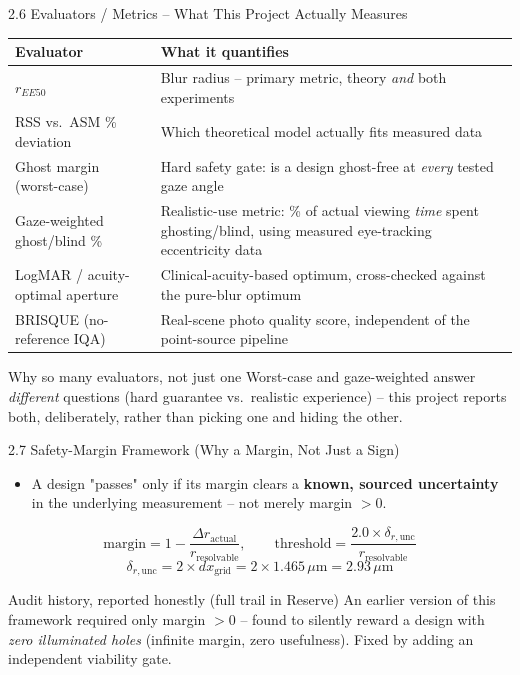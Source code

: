 \documentclass[aspectratio=169]{beamer}
\begin{document}
\begin{frame}{2.6 Evaluators / Metrics -- What This Project Actually Measures}
  \small
  \begin{tabular}{@{}p{3.6cm}p{8.7cm}@{}}
    \toprule
    \textbf{Evaluator} & \textbf{What it quantifies} \\
    \midrule
    $r_{EE50}$ & Blur radius -- primary metric, theory \emph{and} both experiments \\
    RSS vs.\ ASM \% deviation & Which theoretical model actually fits measured data \\
    Ghost margin (worst-case) & Hard safety gate: is a design ghost-free at \emph{every} tested gaze angle \\
    Gaze-weighted ghost/blind \% & Realistic-use metric: \% of actual viewing \emph{time} spent ghosting/blind, using measured eye-tracking eccentricity data \\
    LogMAR / acuity-optimal aperture & Clinical-acuity-based optimum, cross-checked against the pure-blur optimum \\
    BRISQUE (no-reference IQA) & Real-scene photo quality score, independent of the point-source pipeline \\
    \bottomrule
  \end{tabular}
  \vspace{0.3cm}
  \begin{alertblock}{Why so many evaluators, not just one}
    Worst-case and gaze-weighted answer \emph{different} questions (hard
    guarantee vs.\ realistic experience) -- this project reports both,
    deliberately, rather than picking one and hiding the other.
  \end{alertblock}
\end{frame}

\begin{frame}{2.7 Safety-Margin Framework (Why a Margin, Not Just a Sign)}
  \begin{itemize}
    \item A design "passes" only if its margin clears a \textbf{known, sourced
      uncertainty} in the underlying measurement -- not merely margin $>0$.
  \end{itemize}
  \[
    \text{margin} = 1 - \frac{\Delta r_{\text{actual}}}{r_{\text{resolvable}}},
    \qquad
    \text{threshold} = \frac{2.0\times \delta_{r,\text{unc}}}{r_{\text{resolvable}}}
  \]
  \[
    \delta_{r,\text{unc}} = 2\times dx_{\text{grid}} = 2\times1.465\,\mu\text{m} = 2.93\,\mu\text{m}
  \]
  \begin{block}{Audit history, reported honestly (full trail in Reserve)}
    An earlier version of this framework required only margin $>0$ -- found to
    silently reward a design with \emph{zero illuminated holes} (infinite
    margin, zero usefulness). Fixed by adding an independent viability gate.
  \end{block}
\end{frame}
\end{document}
